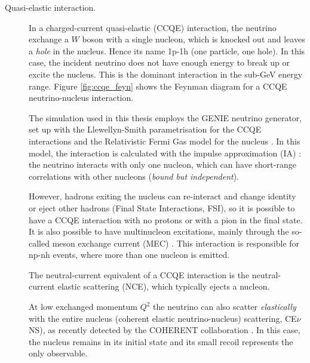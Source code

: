 \begin{description}
\item[Quasi-elastic interaction.] In a charged-current quasi-elastic (CCQE) interaction, the neutrino exchange a $W$ boson with a single nucleon, which is knocked out and leaves a \emph{hole} in the nucleus. Hence its name 1p-1h (one particle, one hole). In this case, the incident neutrino does not have enough energy to break up or excite the nucleus. This is the dominant interaction in the sub-GeV energy range. Figure \ref{fig:ccqe_feyn} shows the Feynman diagram for a CCQE neutrino-nucleus interaction.

The simulation used in this thesis employs the GENIE neutrino generator, set up with the Llewellyn-Smith parametrisation for the CCQE interactions \cite{LlewellynSmith:1971uhs} and the Relativistic Fermi Gas model for the nucleus \cite{Smith:1972xh}.
In this model, the interaction is calculated with the impulse approximation (IA) \cite{Benhar:2005dj}: the neutrino interacts with only one nucleon, which can have short-range correlations with other nucleons (\emph{bound but independent}).

However, hadrons exiting the nucleus can re-interact and change identity or eject other hadrons (Final State Interactions, FSI), so it is possible to have a CCQE interaction with no protons or with a pion in the final state. It is also possible to have multinucleon excitations, mainly through the so-called meson exchange current (MEC) \cite{Bodek:2011ps}. This interaction is responsible for np-nh events, where more than one nucleon is emitted.

The neutral-current equivalent of a CCQE interaction is the neutral-current elastic scattering (NCE), which typically ejects a nucleon.

At low exchanged momentum $Q^2$ the neutrino can also scatter \emph{elastically} with the entire nucleus (coherent elastic neutrino-nucleus) scattering, CE$\nu$NS), as recently detected by the COHERENT collaboration \cite{Akimov:2017ade}. In this case, the nucleus remains in its initial state and its small recoil represents the only observable.


\end{description}
